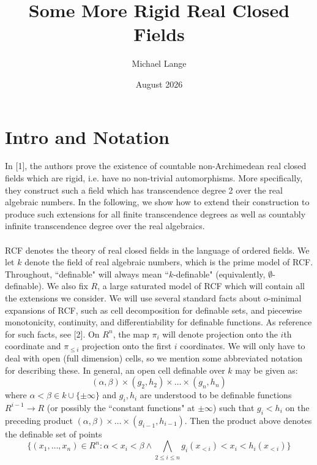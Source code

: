 \documentclass{article}
\title{Some More Rigid Real Closed Fields}
\author{Michael Lange}
\date{August 2026}
\theoremstyle{remark}
\theoremstyle{definition}
\theoremstyle{definition}
\theoremstyle{definition}
\theoremstyle{definition}
\begin{document}
\onehalfspacing
\setlength{\headheight}{14pt}   %
\setlength{\headsep}{8pt} 
\newpage
\maketitle

\maketitle

\section{Intro and Notation}
In [1], the authors prove the existence of countable non-Archimedean real closed fields which are rigid, i.e. have no non-trivial automorphisms. More specifically, they construct such a field which has transcendence degree 2 over the real algebraic numbers. In the following, we show how to extend their construction to produce such extensions for all finite transcendence degrees as well as countably infinite transcendence degree over the real algebraics.
\\
\\
RCF denotes the theory of real closed fields in the language of ordered fields. We let $k$ denote the field of real algebraic numbers, which is the prime model of RCF. Throughout, ``definable" will always mean ``$k$-definable" (equivalently, $\emptyset$-definable). We also fix $R$, a large saturated model of RCF which will contain all the extensions we consider. We will use several standard facts about o-minimal expansions of RCF, such as cell decomposition for definable sets, and piecewise monotonicity, continuity, and differentiability for definable functions. As reference for such facts, see [2]. On $R^n$, the map $\pi_i$ will denote projection onto the $i$th coordinate and $\pi_{\leq i}$ projection onto the first $i$ coordinates. We will only have to deal with open (full dimension) cells, so we mention some abbreviated notation for describing these. In general, an open cell definable over $k$ may be given as:
\[(\alpha,\beta)\times (g_2,h_2)\times\dots\times(g_n,h_n)\]
where $\alpha<\beta\in k\cup\{\pm\infty\}$ and $g_i,h_i$ are understood to be definable functions $R^{i-1}\to R$ (or possibly the ``constant functions" at $\pm \infty$) such that $g_i<h_i$ on the preceding product $(\alpha,\beta)\times\dots\times(g_{i-1},h_{i-1})$. Then the product above denotes the definable set of points \[\{(x_1,\dots,x_n)\in R^n: \alpha<x_i<\beta\land \bigwedge _{2\leq i\leq n}g_i(x_{<i})<x_i<h_i(x_{<i})\}\]
\end{document}
